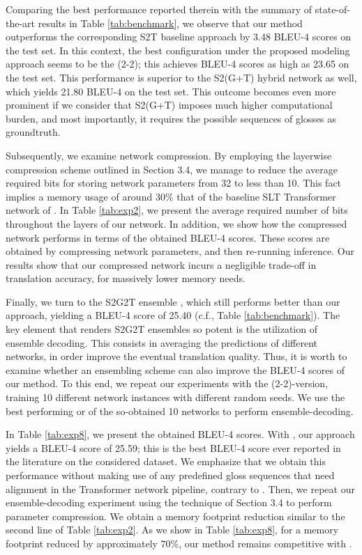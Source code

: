 \documentclass[10pt,twocolumn,letterpaper]{article}
\begin{document}
Comparing the best performance reported therein with the summary of state-of-the-art results in Table \ref{tab:benchmark}, we observe that our method outperforms the corresponding S2T baseline approach by 3.48 BLEU-4 scores on the test set. In this context, the best configuration under the proposed modeling approach seems to be the (2-2); this achieves BLEU-4 scores as high as 23.65 on the test set. This performance is superior to the S2(G+T) hybrid network as well, which yields 21.80 BLEU-4 on the test set. This outcome becomes even more prominent if we consider that S2(G+T) imposes much higher computational burden, and most importantly, it requires the possible sequences of glosses as groundtruth.

Subsequently, we examine network compression. By employing the layerwise compression scheme outlined in Section 3.4, we manage to reduce the average required bits for storing network parameters from 32 to less than 10. This fact implies a memory usage of around 30\% that of the baseline SLT Transformer network of \cite{Camgoz20}. In Table \ref{tab:exp2}, we present the average required number of bits throughout the layers of our network. In addition, we show how the compressed network performs in terms of the obtained BLEU-4 scores. These scores are obtained by compressing network parameters, and then re-running inference. Our results show that our compressed network incurs a negligible trade-off in translation accuracy, for massively lower memory needs.

Finally, we turn to the S2G2T ensemble \cite{yin2020}, which still performs better than our approach, yielding a BLEU-4 score of 25.40 (c.f., Table \ref{tab:benchmark}). The key element that renders S2G2T ensembles so potent is the utilization of ensemble decoding. This consists in averaging the predictions of different networks, in order improve the eventual translation quality. Thus, it is worth to examine whether an ensembling scheme can also improve the BLEU-4 scores of our method. To this end, we repeat our experiments with the (2-2)-version, training 10 different network instances with different random seeds. We use the best performing  or  of the so-obtained 10 networks to perform ensemble-decoding. 

In Table \ref{tab:exp8}, we present the obtained BLEU-4 scores. With , our approach yields a BLEU-4 score of 25.59; this is the best BLEU-4 score ever reported in the literature on the considered dataset. We emphasize that we obtain this performance without making use of any predefined gloss sequences that need alignment in the Transformer network pipeline, contrary to \cite{yin2020}. Then, we repeat our ensemble-decoding experiment using the technique of Section 3.4 to perform parameter compression. We obtain a memory footprint reduction similar to the second line of Table \ref{tab:exp2}. As we show in Table \ref{tab:exp8}, for a memory footprint reduced by approximately 70\%, our method remains competitive with \cite{yin2020}.
\end{document}
